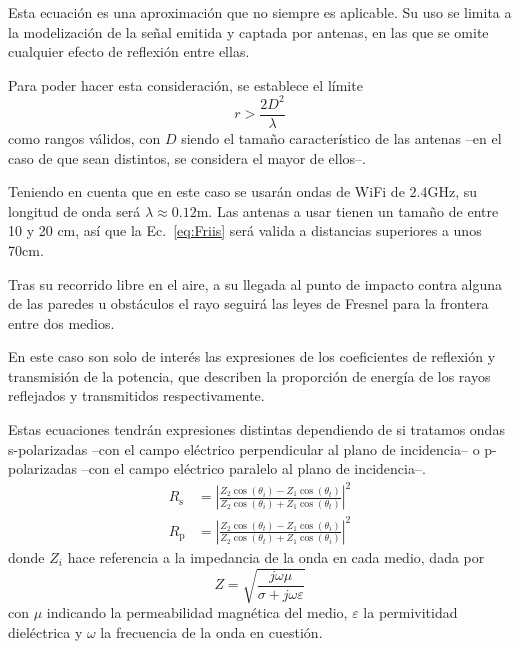 Esta ecuación es una aproximación que no siempre es aplicable.
Su uso se limita a la modelización de la señal emitida y captada por antenas, en las que se omite cualquier efecto de reflexión entre ellas.

Para poder hacer esta consideración, se establece el límite
\begin{equation}
    r > \frac{2D^2}{\lambda}
\end{equation}
como rangos válidos, con $D$ siendo el tamaño característico de las antenas --en el caso de que sean distintos, se considera el mayor de ellos--.

Teniendo en cuenta que en este caso se usarán ondas de WiFi de $2.4\si{\giga\hertz}$, su longitud de onda será $\lambda\approx 0.12\si{\meter}$.
Las antenas a usar tienen un tamaño de entre 10 y 20 cm, así que la Ec.~\eqref{eq:Friis} será valida a distancias superiores a unos 70cm.

Tras su recorrido libre en el aire, a su llegada al punto de impacto contra alguna de las paredes u obstáculos el rayo seguirá las leyes de Fresnel para la frontera entre dos medios.

En este caso son solo de interés las expresiones de los coeficientes de reflexión y transmisión de la potencia, que describen la proporción de energía de los rayos reflejados y transmitidos respectivamente.

Estas ecuaciones tendrán expresiones distintas dependiendo de si tratamos ondas s-polarizadas --con el campo eléctrico perpendicular al plano de incidencia-- o p-polarizadas --con el campo eléctrico paralelo al plano de incidencia--.
\begin{equation}
    \label{eq:coeff_reflx_1}
    \begin{aligned}
        R_\mathrm{s} &= \left|\frac{Z_2 \cos(\theta_i) - Z_1 \cos(\theta_t)}{Z_2 \cos(\theta_i) + Z_1 \cos(\theta_t)}\right|^2\\
        R_\mathrm{p} &= \left|\frac{Z_2 \cos(\theta_t) - Z_1 \cos(\theta_i)}{Z_2 \cos(\theta_t) + Z_1 \cos(\theta_i)}\right|^2
    \end{aligned}
\end{equation}
donde $Z_i$ hace referencia a la impedancia de la onda en cada medio, dada por
\begin{equation}
    Z = \sqrt{\frac{j\omega\mu}{\sigma + j\omega\varepsilon}}
\end{equation}
con $\mu$ indicando la permeabilidad magnética del medio, $\varepsilon$ la permivitidad dieléctrica y $\omega$ la frecuencia de la onda en cuestión.

